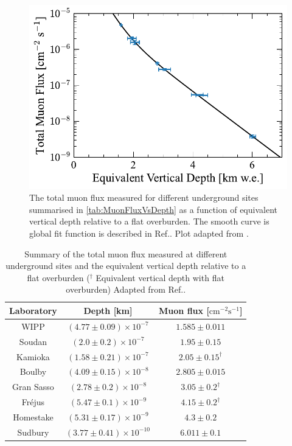 \begin{figure}[ht!]
    \centering
    \includegraphics[width=0.7\linewidth]{figures/Muons/Flux_Depth_Plot.pdf}
    \caption{The total muon flux measured for different underground sites summarised in \autoref{tab:MuonFluxVsDepth} as a function of equivalent vertical depth relative to a flat overburden. The smooth curve is global fit function is described in Ref.\cite{mei}. Plot adapted from \cite{mei}.}
    \label{fig:Muons/MuonFluxVsDepth}
\end{figure}
\begin{table}[ht!]
    \centering
    \begin{tabular}{|c|c|c|}
        \hline
        Laboratory & Depth [km] & Muon flux [$\text{cm}^{-2}\text{s}^{-1}$]\\
        \hline
         WIPP & $(4.77\pm0.09)\times10^{-7}$ & $1.585\pm0.011$\\
         Soudan & $(2.0\pm0.2)\times10^{-7}$ & $1.95\pm0.15$\\
         Kamioka & $(1.58\pm0.21)\times10^{-7}$ & $2.05\pm0.15^\dagger$\\
         Boulby & $(4.09\pm0.15)\times10^{-8}$ & $2.805\pm0.015$\\
         Gran Sasso & $(2.78\pm0.2)\times10^{-8}$ & $3.05\pm0.2^\dagger$\\
         Fr\'ejus & $(5.47\pm0.1)\times10^{-9}$ & $4.15\pm0.2^\dagger$\\
         Homestake & $(5.31\pm0.17)\times10^{-9}$ & $4.3\pm0.2$\\
         Sudbury & $(3.77\pm0.41)\times10^{-10}$ & $6.011\pm0.1$\\
         \hline
    \end{tabular}
    \caption{Summary of the total muon flux measured at different underground sites and the equivalent vertical depth relative to a flat overburden ($^\dagger$ Equivalent vertical depth with flat overburden) Adapted from Ref.\cite{mei}.}
    \label{tab:MuonFluxVsDepth}
\end{table}

